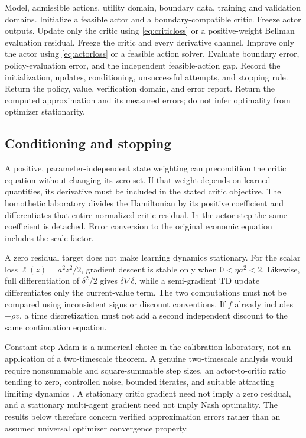 \documentclass[ecta,draft]{econsocart}
\theoremstyle{definition}
\theoremstyle{remark}
\begin{document}
\begin{algorithm}[t]
\caption{NBO evaluation, improvement, and acceptance}\label{alg:nbo}
\begin{algorithmic}[1]
\Require Model, admissible actions, utility domain, boundary data, training and validation domains.
\State Initialize a feasible actor and a boundary-compatible critic.
 \State Freeze actor outputs. Update only the critic using \eqref{eq:criticloss} or a positive-weight Bellman evaluation residual.
 \State Freeze the critic and every derivative channel. Improve only the actor using \eqref{eq:actorloss} or a feasible action solver.
 \State Evaluate boundary error, policy-evaluation error, and the independent feasible-action gap.
 \State Record the initialization, updates, conditioning, unsuccessful attempts, and stopping rule.
  \State Return the policy, value, verification domain, and error report.
 \EndIf
\EndFor
\State Return the computed approximation and its measured errors; do not infer optimality from optimizer stationarity.
\end{algorithmic}
\end{algorithm}

\subsection{Conditioning and stopping}
A positive, parameter-independent state weighting can precondition the critic equation without changing its zero set. If that weight depends on learned quantities, its derivative must be included in the stated critic objective. The homothetic laboratory divides the Hamiltonian by its positive coefficient and differentiates that entire normalized critic residual. In the actor step the same coefficient is detached. Error conversion to the original economic equation includes the scale factor.

A zero residual target does not make learning dynamics stationary. For the scalar loss $\ell(z)=a^2z^2/2$, gradient descent is stable only when $0<\eta a^2<2$. Likewise, full differentiation of $\delta^2/2$ gives $\delta\nabla\delta$, while a semi-gradient TD update differentiates only the current-value term. The two computations must not be compared using inconsistent signs or discount conventions. If $f$ already includes $-\rho v$, a time discretization must not add a second independent discount to the same continuation equation.

Constant-step Adam is a numerical choice in the calibration laboratory, not an application of a two-timescale theorem. A genuine two-timescale analysis would require nonsummable and square-summable step sizes, an actor-to-critic ratio tending to zero, controlled noise, bounded iterates, and suitable attracting limiting dynamics \citep{borkar2024}. A stationary critic gradient need not imply a zero residual, and a stationary multi-agent gradient need not imply Nash optimality. The results below therefore concern verified approximation errors rather than an assumed universal optimizer convergence property.
\end{document}
